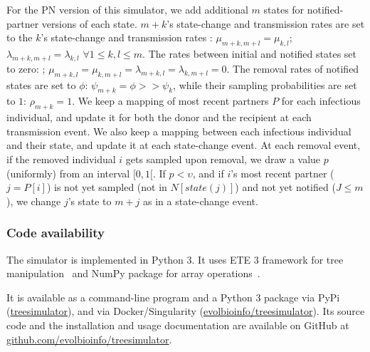 \documentclass[a4paper,10pt]{article}
\begin{document}
For the PN version of this simulator, we add additional $m$ states for notified-partner versions of each state. $m + k$'s state-change and transmission rates are set to the $k$'s state-change and transmission rates : $\mu_{m+k,m+l} = \mu_{k,l}$; $\lambda_{m+k,m+l} = \lambda_{k,l}$ $\forall 1 \leq  k,l \leq m$. The rates between initial and notified states set to zero: ;  $\mu_{m+k,l} = \mu_{k,m+l} = \lambda_{m+k,l} = \lambda_{k,m+l} = 0$. The removal rates of notified states are set to $\phi$: $\psi_{m+k} = \phi >> \psi_k$, while their sampling probabilities are set to $1$: $\rho_{m+k} = 1$. We keep a mapping of most recent partners $P$ for each infectious individual, and update it for both the donor and the recipient at each transmission event. We also keep a mapping between each infectious individual and their state, and update it at each state-change event. At each removal event, if the removed individual $i$ gets sampled upon removal, we draw a value $p$ (uniformly) from an interval $[0, 1[$. If $p < \upsilon$, and if $i$'s most recent partner ($j = P[i]$) is not yet sampled (not in $N[state(j)]$) and not yet notified ($J \leq m$), we change $j$'s state to $m + j$ as in a state-change event.

\subsubsection*{Code availability}
The simulator is implemented in Python 3. It uses ETE 3 framework for tree manipulation~\citep{Huerta-Cepas2016} and NumPy package for array operations~\citep{harris_array_2020}. 

It is available as a command-line program and a Python 3 package via PyPi (\href{https://pypi.org/project/treesimulator}{treesimulator}), and via Docker/Singularity (\href{https://hub.docker.com/r/evolbioinfo/treesimulator/tags}{evolbioinfo/treesimulator}). Its source code and the installation and usage documentation are available on GitHub at \href{https://github.com/evolbioinfo/treesimulator}{github.com/evolbioinfo/treesimulator}.
\end{document}

